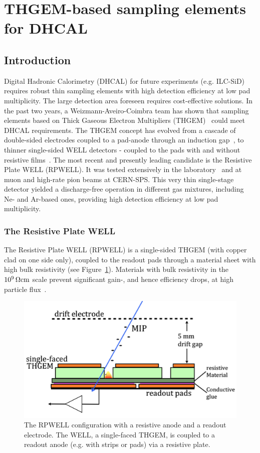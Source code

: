 \section{THGEM-based sampling elements for DHCAL}
\subsection{Introduction}
Digital Hadronic Calorimetry (DHCAL) for future experiments (e.g. ILC-SiD) requires robust thin sampling elements with high detection efficiency at low pad multiplicity. The large detection area foreseen requires cost-effective solutions.
In the past two years, a Weizmann-Aveiro-Coimbra team has shown that sampling elements based on Thick Gaseous Electron Multipliers (THGEM)~\cite{Chechik2004303} could meet DHCAL requirements. The THGEM concept has evolved from a cascade of double-sided electrodes coupled to a pad-anode through an induction gap~\cite{1748-0221-7-05-C05011}, to thinner single-sided WELL detectors - coupled to the pads with and without resistive films~\cite{1748-0221-9-04-P04011,1748-0221-8-07-P07017}.
The most recent and presently leading candidate is the Resistive Plate WELL (RPWELL). It was tested extensively in the laboratory~\cite{1748-0221-8-11-P11004,1748-0221-8-12-C12012} and at muon and high-rate pion beams at CERN-SPS. This very thin single-stage detector yielded a discharge-free operation in different gas mixtures, including Ne- and Ar-based ones, providing high detection efficiency at low pad multiplicity.

\subsubsection{The Resistive Plate WELL}
The Resistive Plate WELL (RPWELL) is a single-sided THGEM (with copper clad on one side only), coupled to the readout pads through a material sheet with high bulk resistivity (see Figure~\ref{fig:Calorimeter:THGEM:rpwell}). Materials with bulk resistivity in the $\unit[10^9]{\Omega cm}$ scale prevent significant gain-, and hence efficiency drops, at high particle flux~\cite{1748-0221-8-11-P11004}.
\begin{figure}
	\centering
	\includegraphics[width=.5\textwidth]{Calorimeter/THGEM/rpwell.png}
	\caption{The RPWELL configuration with a resistive anode and a readout electrode. The WELL, a single-faced THGEM, is coupled to a readout anode (e.g. with strips or pads) via a resistive plate.}
	\label{fig:Calorimeter:THGEM:rpwell}
\end{figure}

